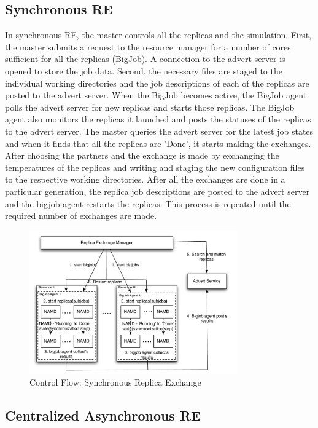 \documentclass{rspublic}
\begin{document}
\subsection{Synchronous RE}

In synchronous RE, the master controls all the replicas and the simulation. 
First, the master submits a request to the resource manager for a  
number of cores sufficient for all the replicas (BigJob). A connection to the 
advert server is opened to store the job data. Second, 
the necessary files are staged to the individual working directories and 
the job descriptions of each of the replicas are 
posted to the advert server. When the BigJob becomes active, 
the BigJob agent polls the advert server for new replicas 
and starts those replicas. The BigJob agent also monitors the 
replicas it launched and posts the statuses of the replicas to the advert 
server. The master queries the advert server for the latest job 
states and when it finds that all the replicas are 'Done', it 
starts making the exchanges. After choosing the partners and the exchange is made by exchanging the temperatures of the replicas and writing and staging the new configuration files 
to the respective working directories. After all the exchanges 
are done in a particular generation, the replica job descriptions 
are posted to the advert server and the bigjob agent restarts the 
replicas. This process is repeated until the required number of 
exchanges are made. 

\begin{figure}[t]
      \centering
          \includegraphics[width=0.8\textwidth]{synchronous.pdf}
          \caption{\footnotesize Control Flow: Synchronous Replica Exchange
              }
      \label{fig:sync}
\end{figure}


\subsection{Centralized Asynchronous RE}
\end{document}
